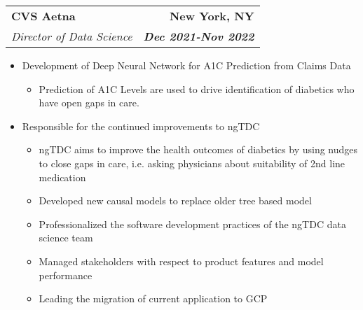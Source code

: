 \documentclass[letterpaper,9pt]{article}
\makeatletter
\newcommand{\resitem}[1]{\item #1 \vspace{-2pt}}
\newcommand{\ressubheading}[4]{
\begin{tabular*}{6.5in}{l@{\extracolsep{\fill}}r}
		\textbf{#1} & {#2} \\
		\textit{#3} & \textit{#4} \\
\end{tabular*}\vspace{-6pt}}
\makeatother
\begin{document}
\ressubheading{CVS Aetna}{\textbf{New York, NY}}{Director of Data Science}{\textbf{Dec 2021-Nov 2022}}
\begin{itemize}
\resitem {Development of Deep Neural Network for A1C Prediction from Claims Data }
	\begin{itemize}
	\item Prediction of A1C Levels are used to drive identification of diabetics who have open gaps in care.
	\end{itemize}

\resitem{Responsible for the continued improvements to ngTDC}
	\begin{itemize}
	\item ngTDC aims to improve the health outcomes of diabetics by using nudges to close gaps in care, i.e. asking physicians about suitability of 2nd line medication
	\item Developed new causal models to replace older tree based model
	\item Professionalized the software development practices of the ngTDC data science team
	\item Managed stakeholders with respect to product features and model performance
	\item Leading the migration of current application to GCP
	\end{itemize}
\end{itemize}
\end{document}
